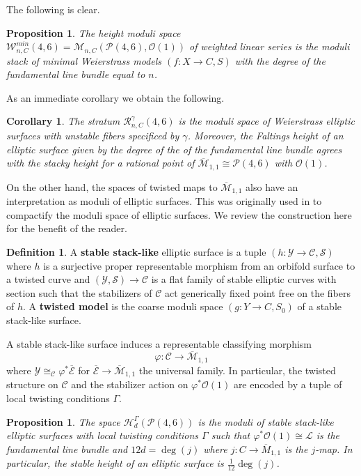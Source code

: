 \documentclass[a4paper,12pt]{amsart}
\newtheorem{cor}[thm]{Corollary}
\newtheorem{prop}[thm]{Proposition}
\theoremstyle{definition}
\newtheorem{defn}[thm]{Definition}
\newcommand{\cY}{\mathcal{Y}}
\newcommand{\cO}{\mathcal{O}}
\newcommand{\cC}{\mathcal{C}}
\newcommand{\cL}{\mathcal{L}}
\newcommand{\cW}{\mathcal{W}}
\newcommand{\cH}{\mathcal{H}}
\newcommand{\cR}{\mathcal{R}}
\newcommand{\cM}{\mathcal{M}}
\newcommand{\cE}{\mathcal{E}}
\newcommand{\cS}{\mathcal{S}}
\newcommand{\cP}{\mathcal{P}}
\newcommand{\Pc}{\mathcal{P}}
\begin{document}
	
	
	
	The following is clear.
	
	\begin{prop}\label{Wei_Ell_Moduli}
		The height moduli space $\cW_{n,C}^{min}(4,6) = \cM_{n,C}(\cP(4,6), \cO(1))$ of weighted linear series is the moduli stack of minimal Weierstrass models $(f : X \to C, S)$ with the degree of the fundamental line bundle equal to $n$. \end{prop}
	
	As an immediate corollary we obtain the following. 
	
	\begin{cor}\label{cor:unstable_height} The stratum $\cR^\gamma_{n,C}(4,6)$ is the moduli space of Weierstrass elliptic surfaces with unstable fibers specificed by $\gamma$. Moreover, the Faltings height of an elliptic surface given by the degree of the of the fundamental line bundle agrees with the stacky height for a rational point of $\overline{\cM}_{1,1} \cong \cP(4,6)$ with $\cO(1)$. 
	\end{cor}
	
	On the other hand, the spaces of twisted maps to $\overline{\cM}_{1,1}$ also have an interpretation as moduli of elliptic surfaces. This was originally used in \cite{av, AB2} to compactify the moduli space of elliptic surfaces. We review the construction here for the benefit of the reader. 
	
	\begin{defn}
		A \textbf{stable stack-like} elliptic surface is a tuple $(h : \cY \to \cC, \cS)$ where $h$ is a surjective proper representable morphism from an orbifold surface to a twisted curve and $(\cY, \cS) \to \cC$ is a flat family of stable elliptic curves with section such that the stabilizers of $\cC$ act generically fixed point free on the fibers of $h$. A \textbf{twisted model} is the coarse moduli space $(g : Y \to C, S_0)$ of a stable stack-like surface.
	\end{defn}
	
	A stable stack-like surface induces a representable classifying morphism
	$$
	\varphi : \cC \to \overline{\cM}_{1,1}
	$$
	where $\cY \cong_{\cC} \varphi^*\overline{\cE}$ for $\overline{\cE} \to \overline{\cM}_{1,1}$ the universal family. In particular, the twisted structure on $\cC$ and the stabilizer action on $\varphi^*\cO(1)$ are encoded by a tuple of local twisting conditions $\Gamma$. 
	
	\begin{prop}\label{prop:Min_Ell_Moduli}
		The space $\cH^\Gamma_d(\Pc(4,6))$ is the moduli of stable stack-like elliptic surfaces with local twisting conditions $\Gamma$ such that $\varphi^*\cO(1) \cong \cL$ is the fundamental line bundle and $12d = \deg(j)$ where $j : C \to \overline{M}_{1,1}$ is the $j$-map. In particular, the stable height of an elliptic surface is $\frac{1}{12}\deg(j)$. 
	\end{prop}
	
\end{document}
